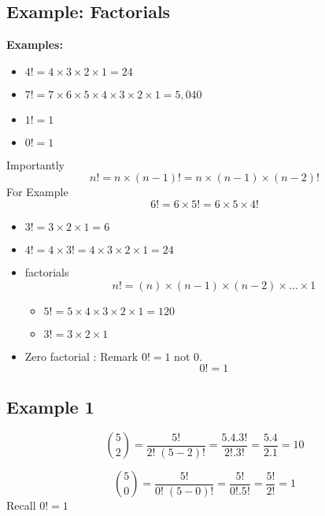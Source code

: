\documentclass[]{report}
\begin{document}
\subsection{Example: Factorials }

\noindent \textbf{Examples:}

\begin{itemize}
	\item $4! = 4 \times 3 \times 2 \times 1 = 24$
	\item $7! = 7 \times 6 \times 5 \times 4 \times 3 \times 2 \times 1 = 5,040$
	\item $1! = 1$
	\item $0! = 1 $
\end{itemize}
Importantly 
\[n! = n \times (n-1)!  = n \times (n-1) \times (n-2)! \]
For Example
\[6! = 6 \times 5!  = 6 \times 5 \times 4! \]



\begin{itemize}
	\item $3!  = 3 \times 2  \times 1 = 6 $
	
	\item $4!  = 4 \times 3! = 4 \times 3 \times 2 \times 1 = 24$
	
	\item factorials 
	\[ n! = (n)\times (n-1)\times(n-2) \times \ldots \times 1 \]
	\begin{itemize}
		\item $5! = 5 \times 4 \times 3 \times 2 \times 1 = 120 $
		\item $3! = 3 \times 2 \times 1$
	\end{itemize}
	\item Zero factorial : Remark $0! = 1$ not $0$.
	\[ 0! =  1 \]
\end{itemize}	

\subsection{Example 1}

\[ \binom 5 2  = \frac{5!}{2!\;(5-2)!} = \frac{5.4.3!}{2! .3!} = \frac{5.4}{2.1} = 10\]


\[ \binom 5 0   = \frac{5!}{0!\;(5-0)!} = \frac{5!}{0! .5!} = \frac{5!}{2!} = 1\]
Recall $0! =1$
\end{document}
